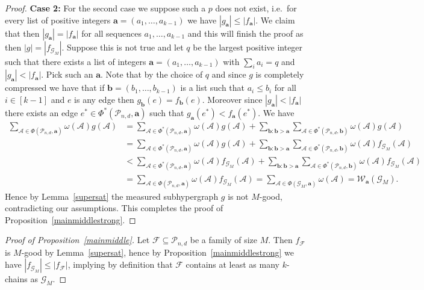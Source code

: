 \documentclass[12pt]{article}
\numberwithin{equation}{section}
\def\A{\mathcal{A}}
\def\F{\mathcal{F}}
\def\G{\mathcal{G}}
\def\P{\mathcal{P}}
\def\W{\mathcal{W}}
\def\w{\omega}
\begin{document}
\begin{proof}
{\bf Case 2:} For the second case we suppose such a $p$ does not exist, i.e.~for every list of positive integers $\mathbf{a}=(a_1,\ldots,a_{k-1})$ we have $|g_{\mathbf{a}}|\leq |f_{\mathbf{a}}|$. We claim that then $|g_{\mathbf{a}}|= |f_{\mathbf{a}}|$ for all sequences $a_1,\ldots,a_{k-1}$ and this will finish the proof as then $|g|=|f_{\G_M}|$.   
Suppose this is not true and let $q$ be the largest positive integer such that there exists a list of integers $\mathbf{a}=(a_1,\ldots,a_{k-1})$ with $\sum_i a_i=q$ and $|g_{\mathbf{a}}|< |f_{\mathbf{a}}|$. Pick such an $\mathbf{a}$. Note that by the choice of $q$ and since $g$ is completely compressed we have that if $\mathbf{b}=(b_1,\ldots,b_{k-1})$ is a list such that $a_i\leq b_i$ for all $i\in [k-1]$ and $e$ is any edge then $g_{\mathbf{b}}(e)= f_{\mathbf{b}}(e)$. Moreover since $|g_{\mathbf{a}}|< |f_{\mathbf{a}}|$ there exists an edge $e^*\in \Phi^*(\P_{n,d},\mathbf{a})$ such that $g_{\mathbf{a}}(e^*)<f_{\mathbf{a}}(e^*)$.  We have
\begin{equation*}
\begin{split}
\sum_{\A\in\Phi(\P_{n,d},\mathbf{a})}\w(\A)g(\A)&=
\sum_{\A\in\Phi^*(\P_{n,d},\mathbf{a})}\w(\A)g(\A) + \sum_{\mathbf{b}:\mathbf{b}>\mathbf{a}} \sum_{\A\in\Phi^*(\P_{n,d},\mathbf{b})}\w(\A)g(\A)
\\&=\sum_{\A\in\Phi^*(\P_{n,d},\mathbf{a})}\w(\A)g(\A) + \sum_{\mathbf{b}:\mathbf{b}>\mathbf{a}} \sum_{\A\in\Phi^*(\P_{n,d},\mathbf{b})}\w(\A)f_{\G_M}(\A)
\\&<\sum_{\A\in\Phi^*(\P_{n,d},\mathbf{a})}\w(\A)f_{\G_M}(\A) + \sum_{\mathbf{b}:\mathbf{b}>\mathbf{a}} \sum_{\A\in\Phi^*(\P_{n,d},\mathbf{b})}\w(\A)f_{\G_M}(\A)
\\&=\sum_{\A\in\Phi(\P_{n,d},\mathbf{a})}\w(\A)f_{\G_M}(\A)
=\sum_{\A\in\Phi(\G_M,\mathbf{a})}\w(\A)=\W_{\mathbf{a}}(\G_M).
\end{split}
\end{equation*}
Hence by Lemma~\ref{supersat} the measured subhypergraph $g$ is not $M$-good, contradicting our assumptions. This completes the proof of Proposition~\ref{mainmiddlestrong}.
\end{proof}

\begin{proof}[Proof of Proposition~\ref{mainmiddle}]
Let $\F\subseteq \P_{n,d}$ be a family of size $M$. Then $f_\F$ is $M$-good by Lemma~\ref{supersat}, hence by Proposition~\ref{mainmiddlestrong} we have $|f_{\G_M}|\leq|f_\F|$, implying by definition that $\F$  contains at least as many $k$-chains as $\G_M$.
\end{proof}
\end{document}
